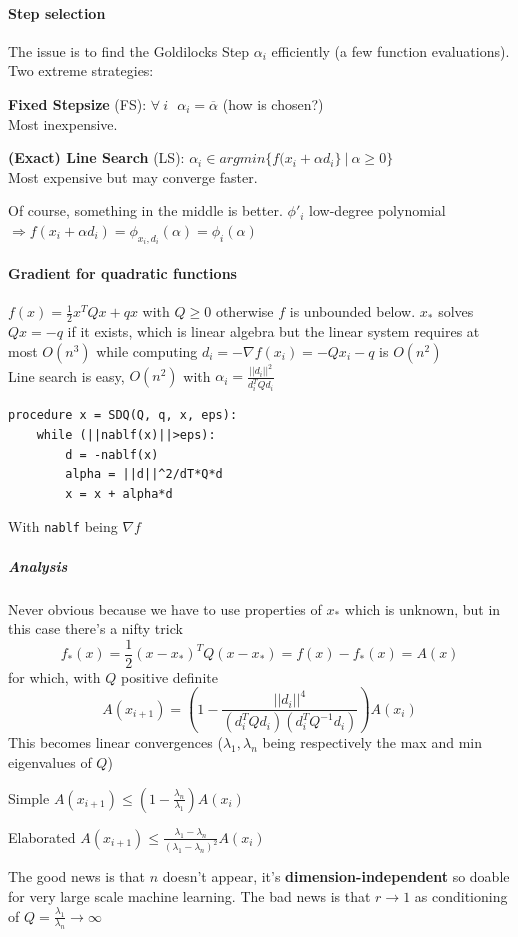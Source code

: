 \documentclass[10pt]{report}
\begin{document}
\paragraph{Step selection} The issue is to find the Goldilocks Step $\alpha_i$ efficiently (a few function evaluations). Two extreme strategies:
\begin{list}{}{}
	\item \textbf{Fixed Stepsize} (FS): $\forall\:i\:\:\:\alpha_i = \overline{\alpha}$ (how is chosen?)\\
	Most inexpensive.
	\item \textbf{(Exact) Line Search} (LS): $\alpha_i\in argmin\{f(x_i+\alpha d_i\}\:|\:\alpha\geq 0\}$\\
	Most expensive but may converge faster.
\end{list}
Of course, something in the middle is better. $\phi'_i$ low-degree polynomial $\Rightarrow f(x_i+\alpha d_i) = \phi_{x_i,d_i}(\alpha) = \phi_i(\alpha)$
\paragraph{Gradient for quadratic functions} $f(x) = \frac{1}{2}x^TQx + qx$ with $Q\geq 0$ otherwise $f$ is unbounded below. $x_*$ solves $Qx = -q$ if it exists, which is linear algebra but the linear system requires at most $O(n^3)$ while computing $d_i = -\nabla f(x_i) = -Qx_i - q$ is $O(n^2)$\\
Line search is easy, $O(n^2)$ with $\alpha_i = \frac{||d_i||^2}{d_i^TQd_i}$
\begin{lstlisting}[style=myPython]
procedure x = SDQ(Q, q, x, eps):
	while (||nablf(x)||>eps):
		d = -nablf(x)
		alpha = ||d||^2/dT*Q*d
		x = x + alpha*d
\end{lstlisting}
With \texttt{nablf} being $\nabla f$
\subparagraph{Analysis} Never obvious because we have to use properties of $x_*$ which is unknown, but in this case there's a nifty trick
$$f_*(x) = \frac{1}{2}(x-x_*)^TQ(x-x_*) = f(x) - f_*(x) = A(x)$$
for which, with $Q$ positive definite $$A(x_{i+1}) = \left(1-\frac{||d_i||^4}{(d_i^TQd_i)(d_i^TQ^{-1}d_i)} \right)A(x_i)$$
This becomes linear convergences ($\lambda_1,\lambda_{n}$ being respectively the max and min eigenvalues of $Q$)
\begin{list}{}{}
	\item Simple $A(x_{i+1}) \leq (1-\frac{\lambda_n}{\lambda_1})A(x_i)$
	\item Elaborated $A(x_{i+1}) \leq \frac{\lambda_1 - \lambda_n}{(\lambda_1 - \lambda_n)^2}A(x_i)$
\end{list}
The good news is that $n$ doesn't appear, it's \textbf{dimension-independent} so doable for very large scale machine learning. The bad news is that $r\rightarrow 1$ as conditioning of $Q = \frac{\lambda_1}{\lambda_n}\rightarrow\infty$
\end{document}
